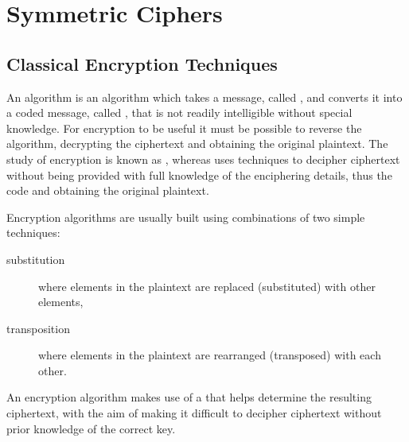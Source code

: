 
\chapter{Symmetric Ciphers}


\section{Classical Encryption Techniques}

An  algorithm is an algorithm which takes a message,
called , and converts it into a coded message, called
, that is not readily intelligible without special knowledge.
For encryption to be useful it must be possible to reverse the algorithm,
decrypting the ciphertext and obtaining the original plaintext.
The study of encryption is known as , whereas
 uses techniques to decipher ciphertext
without being provided with full knowledge of the enciphering details,
thus  the code and obtaining the original plaintext.

Encryption algorithms are usually built using combinations of two simple techniques:
\begin{description}
  \item[substitution] where elements in the plaintext are replaced (substituted)
  with other elements,
  \item[transposition] where elements in the plaintext are rearranged (transposed)
  with each other.
\end{description}
An encryption algorithm makes use of a  that helps determine the
resulting ciphertext, with the aim of making it difficult to decipher ciphertext
without prior knowledge of the correct key.

